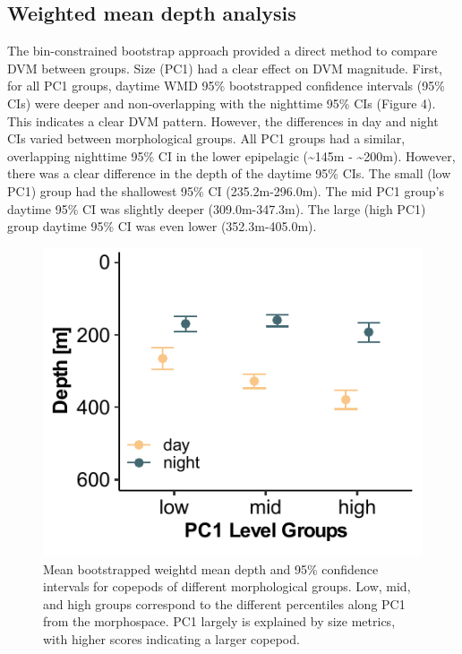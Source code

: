 \documentclass[
  letterpaper,
  DIV=11,
  numbers=noendperiod]{scrartcl}
\begin{document}
\hypertarget{weighted-mean-depth-analysis}{%
\subsection{Weighted mean depth
analysis}\label{weighted-mean-depth-analysis}}

The bin-constrained bootstrap approach provided a direct method to
compare DVM between groups. Size (PC1) had a clear effect on DVM
magnitude. First, for all PC1 groups, daytime WMD 95\% bootstrapped
confidence intervals (95\% CIs) were deeper and non-overlapping with the
nighttime 95\% CIs (Figure 4). This indicates a clear DVM pattern.
However, the differences in day and night CIs varied between
morphological groups. All PC1 groups had a similar, overlapping
nighttime 95\% CI in the lower epipelagic (\textasciitilde145m -
\textasciitilde200m). However, there was a clear difference in the depth
of the daytime 95\% CIs. The small (low PC1) group had the shallowest
95\% CI (235.2m-296.0m). The mid PC1 group's daytime 95\% CI was
slightly deeper (309.0m-347.3m). The large (high PC1) group daytime 95\%
CI was even lower (352.3m-405.0m).

\begin{figure}

{\centering \includegraphics{../media/figure_04.pdf}

}

\caption{Mean bootstrapped weightd mean depth and 95\% confidence
intervals for copepods of different morphological groups. Low, mid, and
high groups correspond to the different percentiles along PC1 from the
morphospace. PC1 largely is explained by size metrics, with higher
scores indicating a larger copepod.}

\end{figure}
\end{document}
